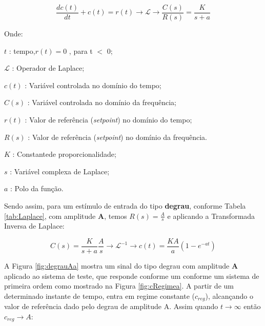 \begin{equation}
	 \frac{d c(t)}{dt} + c(t) = r(t) \rightarrow  \mathscr{L} \to \frac{C(s)}{R(s)} = \frac{K}{s + a} 
\label{eq:ftSistOrdem1a}
\end{equation}


Onde:

\setlength{\parindent}{2cm}

$t$ : tempo,$ r(t) = 0$ , para t $<$ 0;

$\mathscr{L}$ : Operador de Laplace;

$c(t)$ : Variável controlada no domínio do tempo;

$C(s)$ : Variável controlada no domínio da frequência;

$r(t)$ : Valor de referência (\emph{setpoint}) no domínio do tempo;

$R(s)$ : Valor de referência (\emph{setpoint}) no domínio da frequência.

$K$ : Constantede proporcionalidade;

$s$ : Variável complexa de Laplace;

$a$ : Polo da função.
\setlength{\parindent}{1cm}

Sendo assim, para um estímulo de entrada do tipo \textbf{degrau}, conforme Tabela \ref{tab:Laplace}, com amplitude \textbf{A}, temos $ R(s) = \frac{A}{s}$ e aplicando a Transformada Inversa de Laplace:

\begin{equation}
C(s) = \frac{K}{s+a} \frac{A}{s} \rightarrow \mathscr{L}^{-1} \to c(t) = \frac{K A}{a} (1 - e^{-at})
\label{eq:degrauAa}
\end{equation}

A Figura \ref{fig:degrauAa}
mostra um sinal do tipo degrau com amplitude \textbf{A} aplicado ao sistema de teste, que responde conforme um conforme um sistema de primeira ordem como mostrado na Figura \ref{fig:cRegimea}. A partir de um determinado instante de tempo, entra em regime constante ($c_{reg}$), alcançando o valor de referência dado pelo degrau de amplitude A. Assim quando $ t \rightarrow \infty $  então $ c_{reg} \rightarrow A $:


